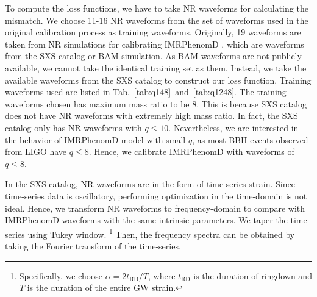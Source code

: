 \documentclass[twocolumn]{aastex631}
\begin{document}
To compute the loss functions, we have to take NR waveforms for calculating the mismatch. We choose 11-16 NR waveforms from the set of waveforms used in the original
calibration process as training waveforms. Originally, 19 waveforms are taken from 
NR simulations for calibrating IMRPhenomD \citep{khan2016frequency}, 
which are waveforms from the SXS catalog \citep{boyle2019sxs} or BAM simulation. 
As BAM waveforms are not publicly available, we cannot take the identical training 
set as them. Instead, we take the available waveforms from the SXS catalog to construct our loss function. Training waveforms used are listed in Tab.~\ref{tab:q148}~and~\ref{tab:q1248}. The training waveforms chosen has maximum mass ratio to be 8. This is because SXS catalog does not have NR waveforms with extremely high mass ratio. In fact, the SXS catalog only has NR waveforms with $q\leq10$. Nevertheless, we are interested in the behavior of IMRPhenomD model with small $q$, as most BBH events observed from LIGO have $q\leq8$. Hence, we calibrate IMRPhenomD with waveforms of $q\leq8$. 

In the SXS catalog, NR waveforms are in the form of time-series strain. Since time-series data is oscillatory, performing optimization in the time-domain is not ideal. Hence, we transform NR waveforms to frequency-domain to compare with IMRPhenomD waveforms with the
same intrinsic parameters. We taper the time-series using Tukey window.
\footnote{ Specifically, we choose $\alpha=2t_{\mathrm{RD}}/T$, where
	$t_{\mathrm{RD}}$ is the duration of ringdown and $T$ is the duration of the
	entire GW strain. } 
Then, the frequency spectra can be obtained by taking the Fourier transform of the time-series.
\end{document}
